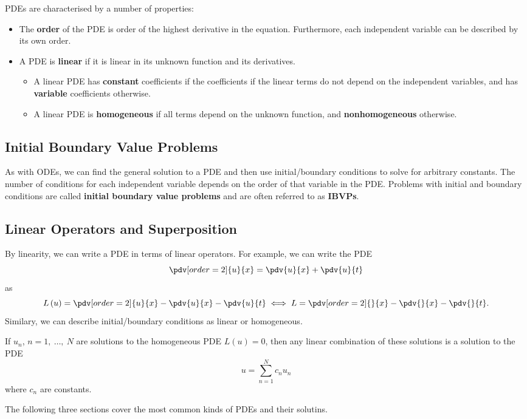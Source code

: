 \documentclass{article}
\begin{document}
PDEs are characterised by a number of properties:
\begin{itemize}
    \item The \textbf{order} of the PDE is order of the highest derivative in the equation.
          Furthermore, each independent variable can be described by its own order.
    \item A PDE is \textbf{linear} if it is linear in its unknown function and its derivatives.
          \begin{itemize}
              \item A linear PDE has \textbf{constant} coefficients if the coefficients if the linear terms do not depend on the independent variables, and has \textbf{variable} coefficients otherwise.
              \item A linear PDE is \textbf{homogeneous} if all terms depend on the unknown function, and \textbf{nonhomogeneous} otherwise.
          \end{itemize}
\end{itemize}
\subsection{Initial Boundary Value Problems}
As with ODEs, we can find the general solution to a PDE and then use initial/boundary conditions to solve for arbitrary constants.
The number of conditions for each independent variable depends on the order of that variable in the PDE\@. Problems with initial and boundary
conditions are called \textbf{initial boundary value problems} and are often referred to as \textbf{IBVPs}.
\subsection{Linear Operators and Superposition}
By linearity, we can write a PDE in terms of linear operators. For example, we can write the PDE
\begin{equation*}
    \pdv[order=2]{u}{x} = \pdv{u}{x} + \pdv{u}{t}
\end{equation*}
as
\begin{equation*}
    L\left( u \right) = \pdv[order=2]{u}{x} - \pdv{u}{x} - \pdv{u}{t} \iff L = \pdv[order=2]{}{x} - \pdv{}{x} - \pdv{}{t}.
\end{equation*}
Similary, we can describe initial/boundary conditions as linear or homogeneous.
\begin{theorem}[Superposition]
    If \(u_n\), \(n = 1,\: \dots,\: N\) are solutions to the homogeneous PDE \(L\left( u \right) = 0\), then any linear combination
    of these solutions is a solution to the PDE
    \begin{equation*}
        u = \sum_{n = 1}^N c_n u_n
    \end{equation*}
    where \(c_n\) are constants.
\end{theorem}
The following three sections cover the most common kinds of PDEs and their solutins.
\end{document}

